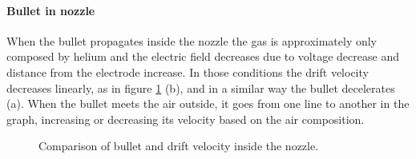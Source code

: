 \paragraph{Bullet in nozzle}
When the bullet propagates inside the nozzle the gas is approximately only composed by helium and the electric field decreases due to voltage decrease and distance from the electrode increase. In those conditions the drift velocity decreases linearly, as in figure \ref{fig:muE} (b), and in a similar way the bullet decelerates (a). When the bullet meets the air outside, it goes from one line to another in the graph, increasing or decreasing its velocity based on the air composition.
\begin{figure}
 \hfill
 \caption{Comparison of bullet and drift velocity inside the nozzle.}
 \label{fig:muE}
\end{figure}

